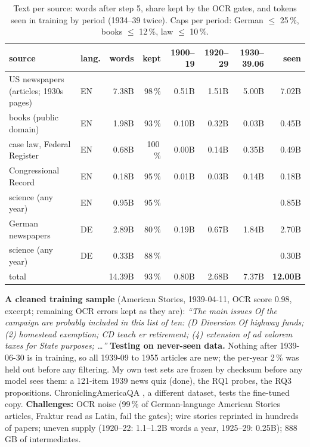 \documentclass[final]{article}
\begin{document}
\begin{table}[!h]
\centering\footnotesize\setlength{\tabcolsep}{3.8pt}
\caption{Text per source: words after step 5, share kept by the OCR gates, and tokens seen in training by period
(1934--39 twice). Caps per period: German $\le$ 25\,\%, books $\le$ 12\,\%, law $\le$ 10\,\%.}
\label{tab:sources}
\begin{tabular}{@{}llrrrrrr@{}}
\toprule
source & lang. & words & kept & 1900--19 & 1920--29 & 1930--39.06 & seen \\
\midrule
US newspapers (articles; 1930s pages) & EN & 7.38B & 98\,\% & 0.51B & 1.51B & 5.00B & 7.02B \\
books (public domain) & EN & 1.98B & 93\,\% & 0.10B & 0.32B & 0.03B & 0.45B \\
case law, Federal Register & EN & 0.68B & 100\,\% & 0.00B & 0.14B & 0.35B & 0.49B \\
Congressional Record & EN & 0.18B & 95\,\% & 0.01B & 0.03B & 0.14B & 0.18B \\
science (any year) & EN & 0.95B & 95\,\% & & & & 0.85B \\
German newspapers & DE & 2.89B & 80\,\% & 0.19B & 0.67B & 1.84B & 2.70B \\
science (any year) & DE & 0.33B & 88\,\% & & & & 0.30B \\
\midrule
total & & 14.39B & 93\,\% & 0.80B & 2.68B & 7.37B & \textbf{12.00B} \\
\bottomrule
\end{tabular}
\end{table}

\noindent\textbf{A cleaned training sample} (American Stories, 1939-04-11, OCR score 0.98, excerpt; remaining OCR
errors kept as they are): \emph{``The main issues Of the campaign are probably included in this list of ten: (D
Diversion Of highway funds; (2) homestead exemption; CD teach er retirement; (4) extension of ad valorem taxes for
State purposes; \ldots''}
\textbf{Testing on never-seen data.} Nothing after 1939-06-30 is in training, so all 1939-09 to 1955 articles are
new; the per-year 2\,\% was held out before any filtering. My own test sets are frozen by checksum before any model
sees them: a 121-item 1939 news quiz (done), the RQ1 probes, the RQ3 propositions. ChroniclingAmericaQA
\citep{piryani2024}, a different dataset, tests the fine-tuned copy.
\textbf{Challenges:} OCR noise (99\,\% of German-language American Stories articles, Fraktur read as Latin, fail
the gates); wire stories reprinted in hundreds of papers; uneven supply (1920--22: 1.1--1.2B words a year, 1925--29:
0.25B); 888\,GB of intermediates.
\end{document}
